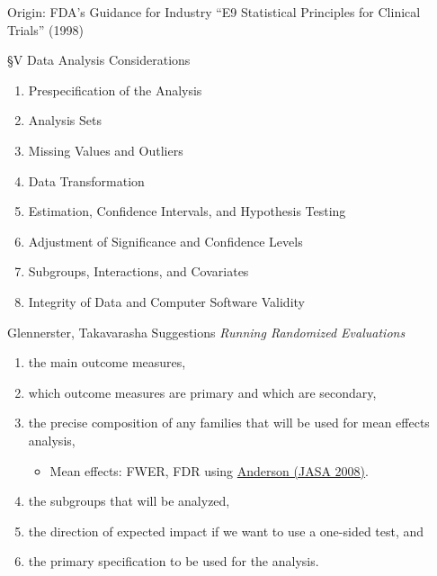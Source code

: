 \documentclass{beamer}
\begin{document}
\begin{frame}{Origin: FDA's Guidance for Industry}
``E9 Statistical Principles for Clinical Trials'' (1998)
\href{http://www.fda.gov/downloads/drugs/guidancecomplianceregulatoryinformation/guidances/ucm073137.pdf}{}

\S V Data Analysis Considerations
\begin{enumerate}
\item Prespecification of the Analysis
\item Analysis Sets
\item Missing Values and Outliers
\item Data Transformation
\item Estimation, Confidence Intervals, and Hypothesis Testing
\item Adjustment of Significance and Confidence Levels
\item Subgroups, Interactions, and Covariates
\item Integrity of Data and Computer Software Validity
\end{enumerate}
\end{frame}


\begin{frame}{Glennerster, Takavarasha Suggestions}
\textit{Running Randomized Evaluations}
\begin{enumerate}[<.->]
\def\labelenumi{\arabic{enumi}.}
\item
  the main outcome measures,
\item
  which outcome measures are primary and which are secondary,
\item
  the precise composition of any families that will be used for mean
  effects analysis,
  \begin{itemize}
  \item Mean effects: FWER, FDR using \href{http://dx.doi.org/10.1198/016214508000000841}{Anderson (JASA 2008)}.
  \end{itemize}
\item
  the subgroups that will be analyzed,
\item
  the direction of expected impact if we want to use a one-sided test,
  and
\item
  the primary specification to be used for the analysis.
\end{enumerate}
\end{frame}
\end{document}
